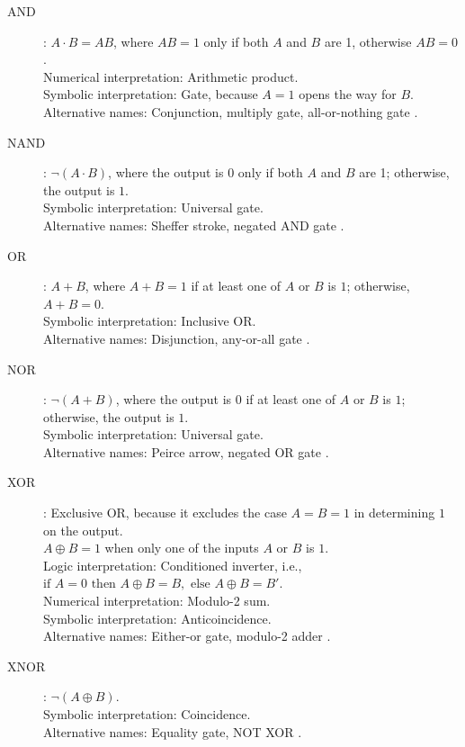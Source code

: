\begin{description}
\item[AND]: \( A \cdot B = AB \), where \( AB = 1 \) only if both \( A \) and \( B \) are 1, otherwise \( AB = 0 \). \\
    Numerical interpretation: Arithmetic product. \\
    Symbolic interpretation:  Gate, because \( A = 1 \) opens the way for \( B \). \\
    Alternative names: Conjunction, multiply gate, all-or-nothing gate \cite{boole1854book, rosen2018}.

\item[NAND]: \( \neg (A \cdot B) \), where the output is \( 0 \) only if both \( A \) and \( B \) are 1; otherwise, the output is \( 1 \). \\
    Symbolic interpretation: Universal gate. \\
    Alternative names: Sheffer stroke, negated AND gate \cite{sheffer1913, rosen2018}.

\item[OR]: \( A + B \), where \( A + B = 1 \) if at least one of \( A \) or \( B \) is \( 1 \); otherwise, \( A + B = 0 \). \\
    Symbolic interpretation: Inclusive OR. \\
    Alternative names: Disjunction, any-or-all gate \cite{rosen2018}.

\item[NOR]: \( \neg (A + B) \), where the output is \( 0 \) if at least one of \( A \) or \( B \) is \( 1 \); otherwise, the output is \( 1 \). \\
    Symbolic interpretation: Universal gate. \\
    Alternative names: Peirce arrow, negated OR gate \cite{peirce1885, rosen2018}.

\item[XOR]: Exclusive OR, because it excludes the case \( A = B = 1 \) in determining \( 1 \) on the output. \\
    \( A \oplus B = 1 \) when only one of the inputs \( A \) or \( B \) is \( 1 \). \\
    Logic interpretation: Conditioned inverter, i.e., \( \text{if } A = 0 \text{ then } A \oplus B = B, \text{ else } A \oplus B = B' \). \\
    Numerical interpretation: Modulo-2 sum. \\
    Symbolic interpretation: Anticoincidence. \\
    Alternative names: Either-or gate, modulo-2 adder \cite{shannon48, rosen2018}.

\item[XNOR]: \( \neg (A \oplus B) \). \\
    Symbolic interpretation: Coincidence. \\
    Alternative names: Equality gate, NOT XOR \cite{mano2017, rosen2018}.
\end{description}

